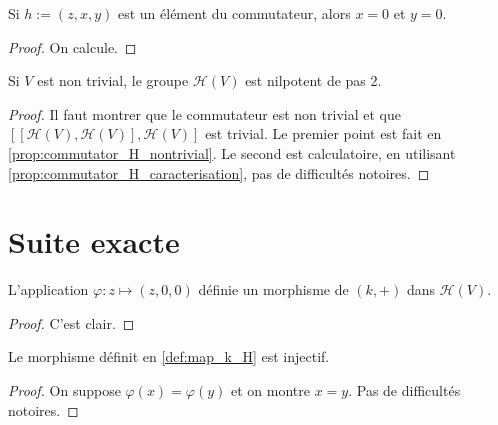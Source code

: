 \begin{proposition}
        \label{prop:commutator_H_caracterisation}
        \leanok
    
        Si $h:=(z,x,y)$ est un élément du commutateur, alors $x=0$ et $y=0$.
    \begin{proof}
        \leanok
        On calcule.
    \end{proof}
\end{proposition}

\begin{theorem}
    \label{thm:two_step_nil}
    \leanok

    Si $V$ est non trivial, le groupe $\mathcal{H}(V)$ est nilpotent de pas 2.
    \begin{proof}
        \leanok
        Il faut montrer que le commutateur est non trivial et que $[[\mathcal{H}(V),\mathcal{H}(V)],\mathcal{H}(V)]$
        est trivial. Le premier point est fait en \ref{prop:commutator_H_nontrivial}.
        Le second est calculatoire, en utilisant \ref{prop:commutator_H_caracterisation}, pas de difficultés notoires.
    \end{proof}
\end{theorem}

\section{Suite exacte}

\begin{definition}
    \label{def:map_k_H}
    \leanok 

    L'application $\varphi:z\mapsto (z,0,0)$ définie un morphisme de 
    $(k,+)$ dans $\mathcal{H}(V)$.
    \begin{proof}
        \leanok
        C'est clair.
    \end{proof}
\end{definition}

\begin{proposition}
    \label{prop:inj_map_k_H}
    \leanok 

    Le morphisme définit en \ref{def:map_k_H} est injectif.
    \begin{proof}
        \leanok
        On suppose $\varphi(x)=\varphi(y)$ et on montre $x=y$. Pas de 
        difficultés notoires.
    \end{proof}
\end{proposition}

